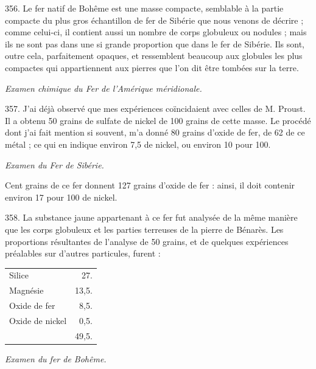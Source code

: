 \documentclass[a4paper, 11pt, oneside, polutonikogreek, french]{article}
\begin{document}
356. Le fer natif de Bohême est une masse compacte, semblable à la partie compacte du plus gros échantillon de fer de Sibérie que nous venons de décrire ; comme celui-ci, il contient aussi un nombre de corps globuleux ou nodules ; mais ils ne sont pas dans une si grande proportion que dans le fer de Sibérie. Ils sont, outre cela, parfaitement opaques, et ressemblent beaucoup aux globules les plus compactes qui appartiennent aux pierres que l'on dit être tombées sur la terre.

\begin{center}
\emph{Examen chimique du Fer de l'Amérique méridionale.}
\end{center}

357. J'ai déjà observé que mes expériences coïncidaient avec celles de M. Proust. Il a obtenu 50 grains de sulfate de nickel de 100 grains de cette masse. Le procédé dont j'ai fait mention si souvent, m'a donné 80 grains d'oxide de fer, de 62 de ce métal ; ce qui en indique environ 7,5 de nickel, ou environ 10 pour 100.

\begin{center}
\emph{Examen du Fer de Sibérie.}
\end{center}

Cent grains de ce fer donnent 127 grains d'oxide de fer : ainsi, il doit contenir environ 17 pour 100 de nickel.

358. La substance jaune appartenant à ce fer fut analysée de la même manière que les corps globuleux et les parties terreuses de la pierre de Bénarès. Les proportions résultantes de l'analyse de 50 grains, et de quelques expériences préalables sur d'autres particules, furent :

\begin{table}[!ht]
    \centering
    \bfseries
    \Fontauri
    \Large
    \begin{tabular}{l r}
        Silice & 27. \\
        Magnésie & 13,5. \\
        Oxide de fer & 8,5. \\
        Oxide de nickel & 0,5. \\ \hline
        ~ & 49,5. \\
    \end{tabular}
\end{table}

\begin{center}
\emph{Examen du fer de Bohême.}
\end{center}
\end{document}
